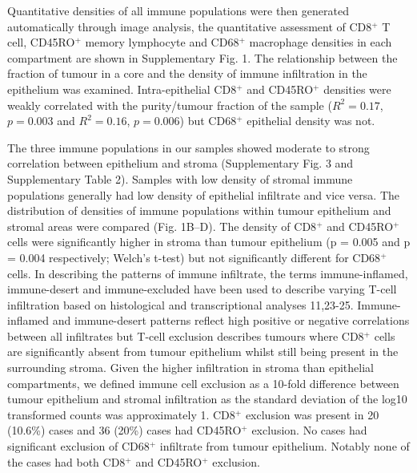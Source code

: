 Quantitative densities of all immune populations were then generated automatically through image analysis, the quantitative assessment of CD8$^+$ T cell, CD45RO$^+$ memory lymphocyte and CD68$^+$ macrophage densities in each compartment are shown in Supplementary Fig. 1. The relationship between the fraction of tumour in a core and the density of immune infiltration in the epithelium was examined. Intra-epithelial CD8$^+$ and CD45RO$^+$ densities were weakly correlated with the purity/tumour fraction of the sample ($R^2 = 0.17$, $p = 0.003$ and $R^2 = 0.16$, $p=0.006$) but CD68$^+$ epithelial density was not. 

The three immune populations in our samples showed moderate to strong correlation between epithelium and stroma (Supplementary Fig. 3 and Supplementary Table 2). Samples with low density of stromal immune populations generally had low density of epithelial infiltrate and vice versa. The distribution of densities of immune populations within tumour epithelium and stromal areas were compared (Fig. 1B–D). The density of CD8$^+$ and CD45RO$^+$ cells were significantly higher in stroma than tumour epithelium (p = 0.005 and p = 0.004 respectively; Welch’s t-test) but not significantly different for CD68$^+$ cells.
In describing the patterns of immune infiltrate, the terms immune-inflamed, immune-desert and immune-excluded have been used to describe varying T-cell infiltration based on histological and transcriptional analyses 11,23-25. Immune-inflamed and immune-desert patterns reflect high positive or negative correlations between all infiltrates but T-cell exclusion describes tumours where CD8$^+$ cells are significantly absent from tumour epithelium whilst still being present in the surrounding stroma\cite{26,27}. Given the higher infiltration in stroma than epithelial compartments, we defined immune cell exclusion as a 10-fold difference between tumour epithelium and stromal infiltration as the standard deviation of the log10 transformed counts was approximately 1. CD8$^+$ exclusion was present in 20 (10.6\%) cases and 36 (20\%) cases had CD45RO$^+$ exclusion. No cases had significant exclusion of CD68$^+$ infiltrate from tumour epithelium.  Notably none of the cases had both CD8$^+$ and CD45RO$^+$ exclusion. %

